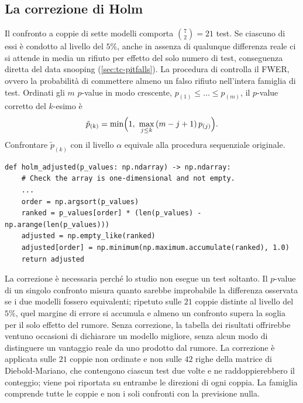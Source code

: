 \subsection{La correzione di Holm}

Il confronto a coppie di sette modelli comporta $\binom72=21$ test. Se ciascuno di essi è condotto al livello del $5\%$, anche in assenza di qualunque differenza reale ci si attende in media un rifiuto per effetto del solo numero di test, conseguenza diretta del data snooping (\cref{sec:tc-pitfalls}). La procedura di \textcite{holm1979simple} controlla il FWER, ovvero la probabilità di commettere almeno un falso rifiuto nell'intera famiglia di test. Ordinati gli $m$ $p$-value in modo crescente, $p_{(1)}\leq\dots\leq p_{(m)}$, il $p$-value corretto del $k$-esimo è
\begin{equation}
\label{eq:holm}
\tilde p_{(k)}=\min\Bigl(1,\ \max_{j\leq k}\,(m-j+1)\,p_{(j)}\Bigr).
\end{equation}
Confrontare $\tilde p_{(k)}$ con il livello $\alpha$ equivale alla procedura sequenziale originale.

\begin{listing}[H]
\begin{verbatim}
def holm_adjusted(p_values: np.ndarray) -> np.ndarray:
    # Check the array is one-dimensional and not empty.
    ...
    order = np.argsort(p_values)
    ranked = p_values[order] * (len(p_values) - np.arange(len(p_values)))
    adjusted = np.empty_like(ranked)
    adjusted[order] = np.minimum(np.maximum.accumulate(ranked), 1.0)
    return adjusted
\end{verbatim}
\caption{\texttt{holm\_adjusted}}
\label{lst:holm-adjusted}
\end{listing}

La correzione è necessaria perché lo studio non esegue un test soltanto. Il $p$-value di un singolo confronto misura quanto sarebbe improbabile la differenza osservata se i due modelli fossero equivalenti; ripetuto sulle $21$ coppie distinte al livello del $5\%$, quel margine di errore si accumula e almeno un confronto supera la soglia per il solo effetto del rumore. Senza correzione, la tabella dei risultati offrirebbe ventuno occasioni di dichiarare un modello migliore, senza alcun modo di distinguere un vantaggio reale da uno prodotto dal rumore. La correzione è applicata sulle $21$ coppie non ordinate e non sulle $42$ righe della matrice di Diebold-Mariano, che contengono ciascun test due volte e ne raddoppierebbero il conteggio; viene poi riportata su entrambe le direzioni di ogni coppia. La famiglia comprende tutte le coppie e non i soli confronti con la previsione nulla.


